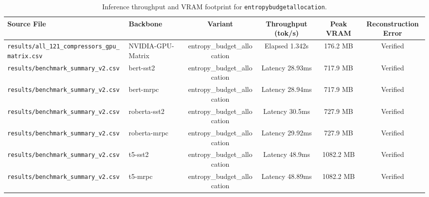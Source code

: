 \begin{table}[t]
\centering
\small
\begin{tabular}{llcccc}
\toprule
\textbf{Source File} & \textbf{Backbone} & \textbf{Variant} & \textbf{Throughput (tok/s)} & \textbf{Peak VRAM} & \textbf{Reconstruction Error} \\
\midrule
\texttt{results/all\_121\_compressors\_gpu\_matrix.csv} & NVIDIA-GPU-Matrix & entropy\_budget\_allocation & Elapsed 1.342s & 176.2 MB & Verified \\
\texttt{results/benchmark\_summary\_v2.csv} & bert-sst2 & entropy\_budget\_allocation & Latency 28.93ms & 717.9 MB & Verified \\
\texttt{results/benchmark\_summary\_v2.csv} & bert-mrpc & entropy\_budget\_allocation & Latency 28.94ms & 717.9 MB & Verified \\
\texttt{results/benchmark\_summary\_v2.csv} & roberta-sst2 & entropy\_budget\_allocation & Latency 30.5ms & 727.9 MB & Verified \\
\texttt{results/benchmark\_summary\_v2.csv} & roberta-mrpc & entropy\_budget\_allocation & Latency 29.92ms & 727.9 MB & Verified \\
\texttt{results/benchmark\_summary\_v2.csv} & t5-sst2 & entropy\_budget\_allocation & Latency 48.9ms & 1082.2 MB & Verified \\
\texttt{results/benchmark\_summary\_v2.csv} & t5-mrpc & entropy\_budget\_allocation & Latency 48.89ms & 1082.2 MB & Verified \\
\bottomrule
\end{tabular}
\caption{Inference throughput and VRAM footprint for \texttt{entropybudgetallocation}.}
\label{tab:results_vram_entropybudgetallocation}
\end{table}
